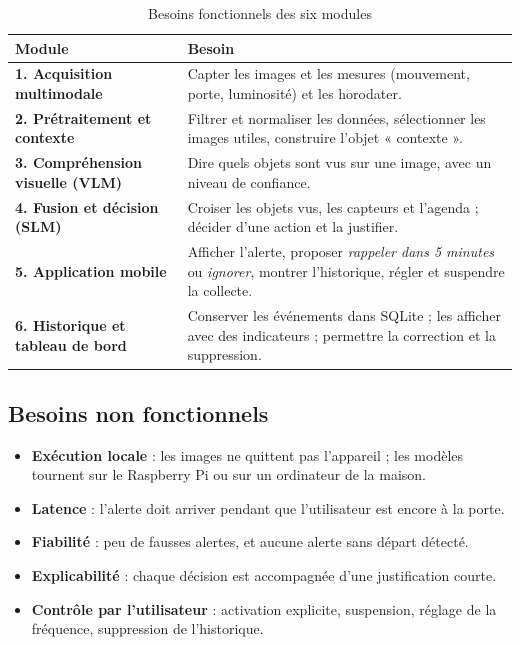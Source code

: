 \begin{table}[H]
  \centering
  \small
  \begin{tabularx}{\linewidth}{>{\bfseries}p{4.2cm}X}
    \toprule
    Module & Besoin \\
    \midrule
    1. Acquisition multimodale & Capter les images et les mesures (mouvement, porte, luminosité) et les horodater. \\
    2. Prétraitement et contexte & Filtrer et normaliser les données, sélectionner les images utiles, construire l'objet « contexte ». \\
    3. Compréhension visuelle (VLM) & Dire quels objets sont vus sur une image, avec un niveau de confiance. \\
    4. Fusion et décision (SLM) & Croiser les objets vus, les capteurs et l'agenda ; décider d'une action et la justifier. \\
    5. Application mobile & Afficher l'alerte, proposer \textit{rappeler dans 5 minutes} ou \textit{ignorer}, montrer l'historique, régler et suspendre la collecte. \\
    6. Historique et tableau de bord & Conserver les événements dans SQLite ; les afficher avec des indicateurs ; permettre la correction et la suppression. \\
    \bottomrule
  \end{tabularx}
  \caption{Besoins fonctionnels des six modules}
  \label{tab:modules}
\end{table}

\subsection{Besoins non fonctionnels}

\begin{itemize}
  \item \textbf{Exécution locale} : les images ne quittent pas l'appareil ; les modèles tournent sur le Raspberry Pi ou sur un ordinateur de la maison.
  \item \textbf{Latence} : l'alerte doit arriver pendant que l'utilisateur est encore à la porte.
  \item \textbf{Fiabilité} : peu de fausses alertes, et aucune alerte sans départ détecté.
  \item \textbf{Explicabilité} : chaque décision est accompagnée d'une justification courte.
  \item \textbf{Contrôle par l'utilisateur} : activation explicite, suspension, réglage de la fréquence, suppression de l'historique.
\end{itemize}


